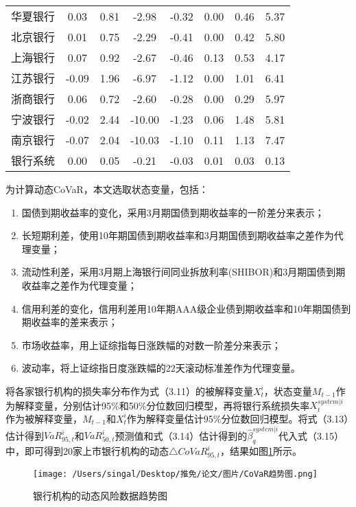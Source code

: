 \documentclass[lang=cn]{elegantpaper}
\begin{document}
\begin{longtable}{cccccccc}
    华夏银行 & 0.03  & 0.81 & -2.98  & -0.32    & 0.00    & 0.46     & 5.37 \\
    北京银行 & 0.01  & 0.75 & -2.29  & -0.41    & 0.00    & 0.42     & 5.80 \\
    上海银行 & 0.07  & 0.92 & -2.67  & -0.46    & 0.13    & 0.53     & 4.17 \\
    江苏银行 & -0.09 & 1.96 & -6.97  & -1.12    & 0.00    & 1.01     & 6.41 \\
    浙商银行 & 0.06  & 0.72 & -2.60  & -0.28    & 0.00    & 0.29     & 5.97 \\
    宁波银行 & -0.02 & 2.44 & -10.00 & -1.23    & 0.06    & 1.48     & 5.81 \\
    南京银行 & -0.07 & 2.04 & -10.03 & -1.10    & 0.11    & 1.13     & 7.47 \\
    银行系统 & 0.00  & 0.05 & -0.21  & -0.03    & 0.01    & 0.03     & 0.13 \\ \bottomrule
\end{longtable}

为计算动态CoVaR，本文选取状态变量，包括：
\begin{enumerate}
    \item 国债到期收益率的变化，采用3月期国债到期收益率的一阶差分来表示；
    \item 长短期利差，使用10年期国债到期收益率和3月期国债到期收益率之差作为代理变量；
    \item 流动性利差，采用3月期上海银行间同业拆放利率(SHIBOR)和3月期国债到期收益率之差作为代理变量；
    \item 信用利差的变化，信用利差用10年期AAA级企业债到期收益率和10年期国债到期收益率的差来表示；
    \item 市场收益率，用上证综指每日涨跌幅的对数一阶差分来表示；
    \item 波动率，将上证综指日度涨跌幅的22天滚动标准差作为代理变量。
\end{enumerate}

将各家银行机构的损失率分布作为式（3.11）的被解释变量$X_t^i$，状态变量$M_{t-1}$作为解释变量，分别估计95\%和50\%分位数回归模型，再将银行系统损失率$X_t^{system|i}$作为被解释变量，$M_{t-1}$和$X_t^i$作为解释变量估计95\%分位数回归模型。将式（3.13）估计得到$VaR_{95,t}^i$和$VaR_{50,t}^i$预测值和式（3.14）估计得到的$\hat\beta_q^{system|i}$代入式（3.15）中，即可得到20家上市银行机构的动态$\bigtriangleup CoVaR_{95,t}^i$，结果如图\ref{图3}所示。
\begin{figure}[htb]
    \centering
    \texttt{[image: /Users/singal/Desktop/推免/论文/图片/CoVaR趋势图.png]}
    \caption{银行机构的动态风险数据趋势图}
    \label{图3}
\end{figure}
\end{document}
